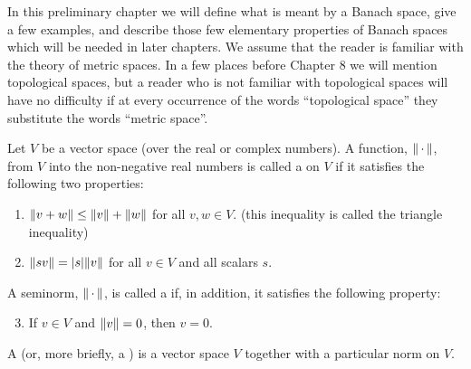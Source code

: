 
In this preliminary chapter we will define what is meant by a Banach space, give a few examples, and describe those few elementary properties of Banach spaces which will be needed in later chapters. We assume that the reader is familiar with the theory of metric spaces. In a few places before Chapter 8 we will mention topological spaces, but a reader who is not familiar with topological spaces will have no difficulty if at every occurrence of the words ``topological space'' they substitute the words ``metric space''.

\begin{definition}\label{def:norm}
Let $V$ be a vector space (over the real or complex numbers). A function, $\norm{\,\cdot\,}$, from $V$ into the non-negative real numbers is called a  on $V$ if it satisfies the following two properties:
\begin{enumerate}[label=\alph*)]
    \item $\norm{v+w}\leq\norm{v}+\norm{w}$ for all $v,w\in V$. (this inequality is called the triangle inequality)
    \item $\norm{sv}=|s|\norm{v}$ for all $v\in V$ and all scalars $s$.
\end{enumerate}
A seminorm, $\norm{\,\cdot\,}$, is called a  if, in addition, it satisfies the following property:
\begin{enumerate}[label=\alph*)]
    \setcounter{enumi}{2}
    \item If $v\in V$ and $\norm{v}=0$, then $v=0$.
\end{enumerate}
\end{definition}

\begin{definition}\label{def:norm space}
A  (or, more briefly, a ) is a vector space $V$ together with a particular norm on $V$.
\end{definition}



